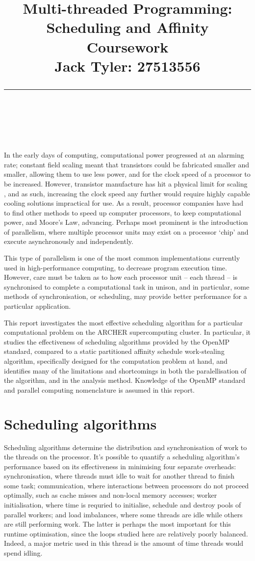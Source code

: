 \documentclass{article} %
\title{\raggedright
\normalfont \normalsize 
\huge Multi-threaded Programming: Scheduling and Affinity Coursework \\[1em]
\normalsize \normalfont Jack Tyler: 27513556 \\
\rule{\linewidth}{.5pt}  \\[6pt]
}
\begin{document}
\maketitle

In the early days of computing, computational power progressed at an alarming rate; constant field scaling meant that transistors could be fabricated smaller and smaller, allowing them to use less power, and for the clock speed of a processor to be increased.
However, transistor manufacture has hit a physical limit for scaling \citep{Mcfarland1995}, and as such, increasing the clock speed any further would require highly capable cooling solutions impractical for use.
As a result, processor companies have had to find other methods to speed up computer processors, to keep computational power, and Moore's Law, advancing.
Perhaps most prominent is the introduction of parallelism, where multiple processor units may exist on a processor `chip' and execute asynchronously and independently.

This type of parallelism is one of the most common implementations currently used in high-performance computing, to decrease program execution time.
However, care must be taken as to how each processor unit -- each thread -- is synchronised to complete a computational task in unison, and in particular,
some methods of synchronisation, or scheduling, may provide better performance for a particular application.

This report investigates the most effective scheduling algorithm for a particular computational problem on the ARCHER supercomputing cluster.
In particular, it studies the effectiveness of scheduling algorithms provided by the OpenMP standard, compared to a static partitioned affinity schedule work-stealing algorithm, specifically designed for the computation problem at hand, and identifies many of the limitations and shortcomings in both the paralellisation of the algorithm, and in the analysis method. Knowledge of the OpenMP standard and parallel computing nomenclature is assumed in this report.

\section*{Scheduling algorithms}

Scheduling algorithms determine the distribution and synchronisation of work to the threads on the processor.
It's possible to quantify a scheduling algorithm's performance based on its effectiveness in minimising four separate overheads:
synchronisation, where threads must idle to wait for another thread to finish some task;
communication, where interactions between processors do not proceed optimally, such as cache misses and non-local memory accesses;
worker initialisation, where time is requried to initialise, schedule and destroy pools of parallel workers;
and load imbalances, where some threads are idle while others are still performing work.
The latter is perhaps the most important for this runtime optimisation, since the loops studied here are relatively poorly balanced.
Indeed, a major metric used in this thread is the amount of time threads would spend idling.
\end{document}
